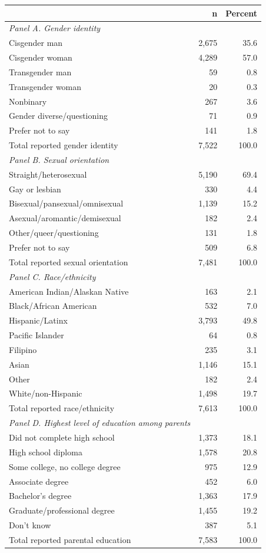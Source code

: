 
\begin{tabular}{@{}lrr@{}}
\toprule
& n & Percent \\
\midrule
\emph{Panel A. Gender identity} & & \\
\quad Cisgender man & 2,675 & 35.6 \\
\quad Cisgender woman & 4,289 & 57.0 \\
\quad Transgender man & 59 & 0.8 \\
\quad Transgender woman & 20 & 0.3 \\
\quad Nonbinary & 267 & 3.6 \\
\quad Gender diverse/questioning & 71 & 0.9 \\
\quad Prefer not to say & 141 & 1.8 \\
\midrule
Total reported gender identity & 7,522 & 100.0 \\
\midrule
\emph{Panel B. Sexual orientation} & & \\
\quad Straight/heterosexual & 5,190 & 69.4 \\
\quad Gay or lesbian & 330 & 4.4 \\
\quad Bisexual/pansexual/omnisexual & 1,139 & 15.2 \\
\quad Asexual/aromantic/demisexual & 182 & 2.4 \\
\quad Other/queer/questioning & 131 & 1.8 \\
\quad Prefer not to say & 509 & 6.8 \\
\midrule
Total reported sexual orientation & 7,481 & 100.0 \\
\midrule 
\emph{Panel C. Race/ethnicity} & & \\
\quad American Indian/Alaskan Native & 163 & 2.1 \\
\quad Black/African American & 532 & 7.0 \\
\quad Hispanic/Latinx & 3,793 & 49.8 \\
\quad Pacific Islander & 64 & 0.8 \\
\quad Filipino & 235 & 3.1 \\
\quad Asian & 1,146 & 15.1 \\
\quad Other & 182 & 2.4 \\
\quad White/non-Hispanic & 1,498 & 19.7 \\
\midrule
Total reported race/ethnicity & 7,613 & 100.0 \\
\midrule
\emph{Panel D. Highest level of education
among parents} & & \\
\quad Did not complete high school & 1,373 & 18.1 \\
\quad High school diploma & 1,578 & 20.8 \\
\quad Some college, no college degree & 975 & 12.9 \\
\quad Associate degree & 452 & 6.0 \\
\quad Bachelor's degree & 1,363 & 17.9 \\
\quad Graduate/professional degree & 1,455 & 19.2 \\
\quad Don't know & 387 & 5.1 \\
\midrule
Total reported parental education & 7,583 & 100.0 \\
\bottomrule\bottomrule
\end{tabular}
